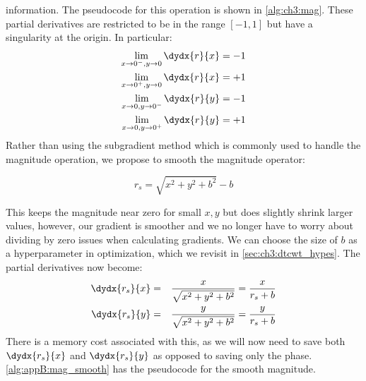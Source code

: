 information. The pseudocode for this operation is shown in
\autoref{alg:ch3:mag}.
%
These partial derivatives are restricted to be in the range $[-1, 1]$ but have a singularity at the origin.
In particular:
\begin{align}
  \lim_{x\rightarrow 0^{-},y\rightarrow 0}  \dydx{r}{x} &= -1 \\
  \lim_{x\rightarrow 0^{+},y\rightarrow 0}  \dydx{r}{x} &= +1 \\
  \lim_{x\rightarrow 0,y\rightarrow 0^{-}}  \dydx{r}{y} &= -1 \\
  \lim_{x\rightarrow 0,y\rightarrow 0^{+}}  \dydx{r}{y} &= +1
\end{align}
Rather than using the subgradient method \cite{boyd_subgradient_2003} which is
commonly used to handle the magnitude operation, we propose to smooth the
magnitude operator:

\begin{equation}\label{eq:ch3:magbias}
 r_s = \sqrt{x^2 + y^2 + b^2} - b
\end{equation}

This keeps the magnitude near zero for small $x,y$ but does slightly shrink larger
values, however, our gradient is smoother and we no
longer have to worry about dividing by zero issues when calculating gradients.
We can choose the size of $b$ as a hyperparameter in optimization, which we
revisit in \autoref{sec:ch3:dtcwt_hypes}. The partial derivatives now become:
\begin{eqnarray}
  \dydx{r_s}{x} & = & \frac{x}{\sqrt{x^2 + y^2+b^2}} = \frac{x}{r_s+b}\\
  \dydx{r_s}{y} & = & \frac{y}{\sqrt{x^2 + y^2+b^2}} = \frac{y}{r_s+b}
\end{eqnarray}
There is a memory cost associated with this, as we will now need to save both
$\dydx{r_s}{x}$ and $\dydx{r_s}{y}$ as opposed to saving only the phase.
\autoref{alg:appB:mag_smooth} has the pseudocode for the smooth magnitude.

